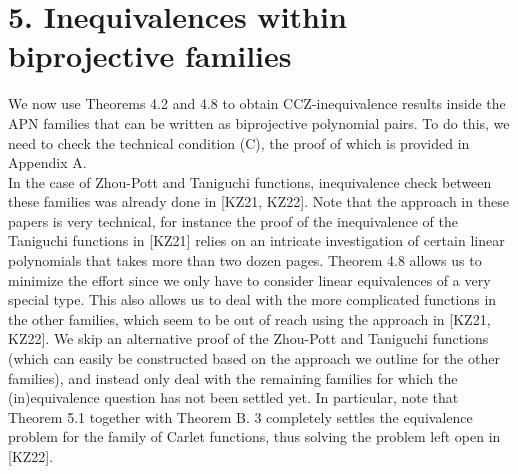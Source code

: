 \documentclass[10pt]{article}
\begin{document}
\section*{5. Inequivalences within biprojective families}
We now use Theorems 4.2 and 4.8 to obtain CCZ-inequivalence results inside the APN families that can be written as biprojective polynomial pairs. To do this, we need to check the technical condition (C), the proof of which is provided in Appendix A.\\[0pt]
In the case of Zhou-Pott and Taniguchi functions, inequivalence check between these families was already done in [KZ21, KZ22]. Note that the approach in these papers is very technical, for instance the proof of the inequivalence of the Taniguchi functions in [KZ21] relies on an intricate investigation of certain linear polynomials that takes more than two dozen pages. Theorem 4.8 allows us to minimize the effort since we only have to consider linear equivalences of a very special type. This also allows us to deal with the more complicated functions in the other families, which seem to be out of reach using the approach in [KZ21, KZ22]. We skip an alternative proof of the Zhou-Pott and Taniguchi functions (which can easily be constructed based on the approach we outline for the other families), and instead only deal with the remaining families for which the (in)equivalence question has not been settled yet. In particular, note that Theorem 5.1 together with Theorem B. 3 completely settles the equivalence problem for the family of Carlet functions, thus solving the problem left open in [KZ22].
\end{document}
